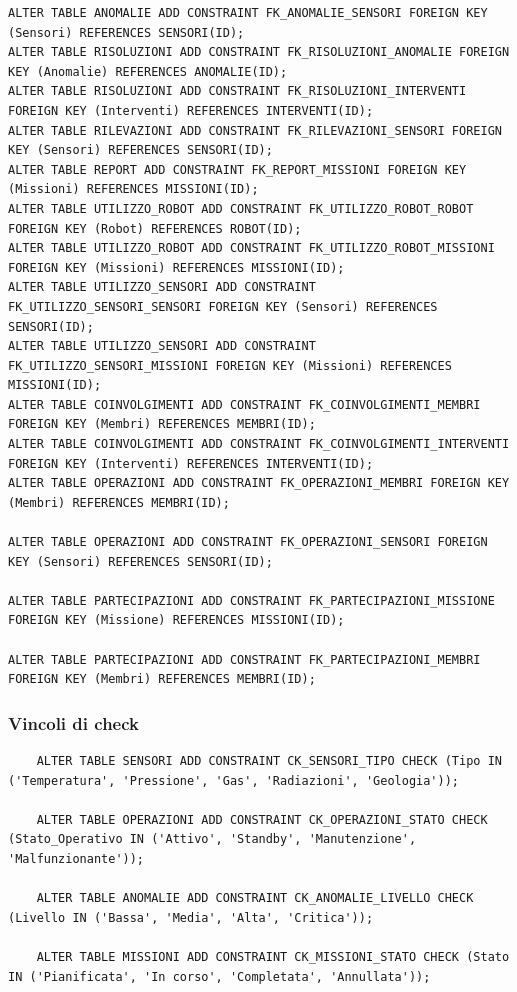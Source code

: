 \begin{lstlisting}
ALTER TABLE ANOMALIE ADD CONSTRAINT FK_ANOMALIE_SENSORI FOREIGN KEY (Sensori) REFERENCES SENSORI(ID);
ALTER TABLE RISOLUZIONI ADD CONSTRAINT FK_RISOLUZIONI_ANOMALIE FOREIGN KEY (Anomalie) REFERENCES ANOMALIE(ID);
ALTER TABLE RISOLUZIONI ADD CONSTRAINT FK_RISOLUZIONI_INTERVENTI FOREIGN KEY (Interventi) REFERENCES INTERVENTI(ID);
ALTER TABLE RILEVAZIONI ADD CONSTRAINT FK_RILEVAZIONI_SENSORI FOREIGN KEY (Sensori) REFERENCES SENSORI(ID);
ALTER TABLE REPORT ADD CONSTRAINT FK_REPORT_MISSIONI FOREIGN KEY (Missioni) REFERENCES MISSIONI(ID);
ALTER TABLE UTILIZZO_ROBOT ADD CONSTRAINT FK_UTILIZZO_ROBOT_ROBOT FOREIGN KEY (Robot) REFERENCES ROBOT(ID);
ALTER TABLE UTILIZZO_ROBOT ADD CONSTRAINT FK_UTILIZZO_ROBOT_MISSIONI FOREIGN KEY (Missioni) REFERENCES MISSIONI(ID);
ALTER TABLE UTILIZZO_SENSORI ADD CONSTRAINT FK_UTILIZZO_SENSORI_SENSORI FOREIGN KEY (Sensori) REFERENCES SENSORI(ID);
ALTER TABLE UTILIZZO_SENSORI ADD CONSTRAINT FK_UTILIZZO_SENSORI_MISSIONI FOREIGN KEY (Missioni) REFERENCES MISSIONI(ID);
ALTER TABLE COINVOLGIMENTI ADD CONSTRAINT FK_COINVOLGIMENTI_MEMBRI FOREIGN KEY (Membri) REFERENCES MEMBRI(ID);
ALTER TABLE COINVOLGIMENTI ADD CONSTRAINT FK_COINVOLGIMENTI_INTERVENTI FOREIGN KEY (Interventi) REFERENCES INTERVENTI(ID);
ALTER TABLE OPERAZIONI ADD CONSTRAINT FK_OPERAZIONI_MEMBRI FOREIGN KEY (Membri) REFERENCES MEMBRI(ID);

ALTER TABLE OPERAZIONI ADD CONSTRAINT FK_OPERAZIONI_SENSORI FOREIGN KEY (Sensori) REFERENCES SENSORI(ID);

ALTER TABLE PARTECIPAZIONI ADD CONSTRAINT FK_PARTECIPAZIONI_MISSIONE FOREIGN KEY (Missione) REFERENCES MISSIONI(ID);

ALTER TABLE PARTECIPAZIONI ADD CONSTRAINT FK_PARTECIPAZIONI_MEMBRI FOREIGN KEY (Membri) REFERENCES MEMBRI(ID);
\end{lstlisting}

\subsubsection{Vincoli di check}

\begin{lstlisting}
    ALTER TABLE SENSORI ADD CONSTRAINT CK_SENSORI_TIPO CHECK (Tipo IN ('Temperatura', 'Pressione', 'Gas', 'Radiazioni', 'Geologia'));
    
    ALTER TABLE OPERAZIONI ADD CONSTRAINT CK_OPERAZIONI_STATO CHECK (Stato_Operativo IN ('Attivo', 'Standby', 'Manutenzione', 'Malfunzionante'));
    
    ALTER TABLE ANOMALIE ADD CONSTRAINT CK_ANOMALIE_LIVELLO CHECK (Livello IN ('Bassa', 'Media', 'Alta', 'Critica'));
    
    ALTER TABLE MISSIONI ADD CONSTRAINT CK_MISSIONI_STATO CHECK (Stato IN ('Pianificata', 'In corso', 'Completata', 'Annullata'));
\end{lstlisting}


